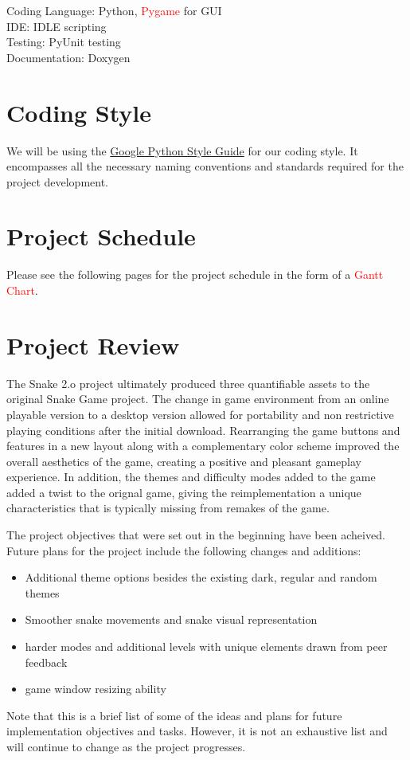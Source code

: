 \documentclass{article}
\begin{document}
Coding Language: Python, \textcolor{red}{Pygame} for GUI\\
IDE: IDLE scripting\\
Testing: PyUnit testing\\
Documentation: Doxygen\\

\section{Coding Style}

We will be using the \href{https://github.com/google/styleguide/blob/gh-pages/pyguide.md}{Google Python Style Guide}
for our coding style. It encompasses all the necessary naming conventions and standards required for the project development.

\section{Project Schedule}
Please see the following pages for the project schedule in the form of a \textcolor{red}{Gantt Chart}.



\section{Project Review}

The Snake 2.o project ultimately produced three quantifiable assets to the original Snake Game project. The change in game environment from an online playable version to a desktop version allowed for portability and non restrictive playing conditions after the initial download. Rearranging the game buttons and features in a new layout along with a complementary color scheme improved the overall aesthetics of the game, creating a positive and pleasant gameplay experience. In addition, the themes and difficulty modes added to the game added a twist to the orignal game, giving the reimplementation a unique characteristics that is typically missing from remakes of the game. 

The project objectives that were set out in the beginning have been acheived. Future plans for the project include the following changes and additions:
\begin{itemize}
\item Additional theme options besides the existing dark, regular and random themes
\item Smoother snake movements and snake visual representation
\item harder modes and additional levels with unique elements drawn from peer feedback
\item game window resizing ability
\end{itemize}

Note that this is a brief list of some of the ideas and plans for future implementation objectives and tasks. However, it is not an exhaustive list and will continue to change as the project progresses.
\end{document}
